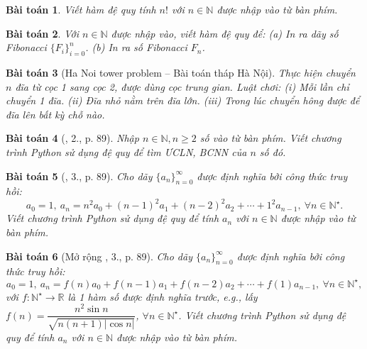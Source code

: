 \documentclass{article}
\newtheorem{baitoan}{Bài toán}
\begin{document}
\begin{baitoan}
    Viết hàm đệ quy tính $n!$ với $n\in\mathbb{N}$ được nhập vào từ bàn phím.
\end{baitoan}

\begin{baitoan}
    Với $n\in\mathbb{N}$ được nhập vào, viết hàm đệ quy để: (a) In ra dãy số Fibonacci $\{F_i\}_{i=0}^n$. (b) In ra số Fibonacci $F_n$.
\end{baitoan}

\begin{baitoan}[Ha Noi tower problem -- Bài toán tháp Hà Nội]
    Thực hiện chuyển $n$ đĩa từ cọc 1 sang cọc 2, được dùng cọc trung gian. Luật chơi: (i) Mỗi lần chỉ chuyển 1 đĩa. (ii) Đĩa nhỏ nằm trên đĩa lớn. (iii) Trong lúc chuyển hông được để đĩa lên bất kỳ chỗ nào.
\end{baitoan}

\begin{baitoan}[\cite{Que_BT_Python}, 2., p. 89]
    Nhập $n\in\mathbb{N},n\ge2$ số vào từ bàn phím. Viết chương trình Python sử dụng đệ quy để tìm {\rm ƯCLN, BCNN} của $n$ số đó.
\end{baitoan}

\begin{baitoan}[\cite{Que_BT_Python}, 3., p. 89]
    Cho dãy $\{a_n\}_{n=0}^\infty$ được định nghĩa bởi công thức truy hồi:
    \begin{equation*}
        a_0 = 1,\ a_n = n^2a_0 + (n - 1)^2a_1 + (n - 2)^2a_2 + \cdots + 1^2a_{n-1},\ \forall n\in\mathbb{N}^\star.
    \end{equation*}
    Viết chương trình Python sử dụng đệ quy để tính $a_n$ với $n\in\mathbb{N}$ được nhập vào từ bàn phím. 
\end{baitoan}

\begin{baitoan}[Mở rộng \cite{Que_BT_Python}, 3., p. 89]
    Cho dãy $\{a_n\}_{n=0}^\infty$ được định nghĩa bởi công thức truy hồi:
    \begin{equation*}
        a_0 = 1,\ a_n = f(n)a_0 + f(n - 1)a_1 + f(n - 2)a_2 + \cdots + f(1)a_{n-1},\ \forall n\in\mathbb{N}^\star,
    \end{equation*}
    với $f:\mathbb{N}^\star\to\mathbb{R}$ là 1 hàm số được định nghĩa trước, e.g., lấy $f(n) = \dfrac{n^2\sin n}{\sqrt{n(n + 1)|\cos n|}}$, $\forall n\in\mathbb{N}^\star$. Viết chương trình Python sử dụng đệ quy để tính $a_n$ với $n\in\mathbb{N}$ được nhập vào từ bàn phím. 
\end{baitoan}
\end{document}
